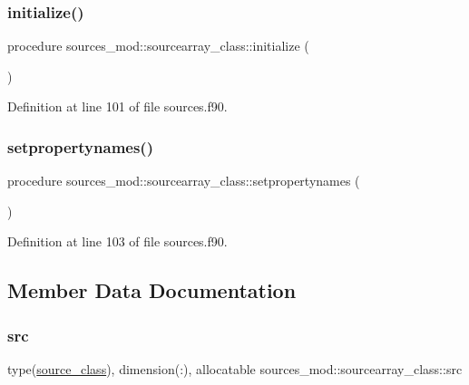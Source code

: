 \subsubsection{\texorpdfstring{initialize()}{initialize()}}
{\footnotesize\ttfamily procedure sources\+\_\+mod\+::sourcearray\+\_\+class\+::initialize (\begin{DoxyParamCaption}{ }\end{DoxyParamCaption})\hspace{0.3cm}{\ttfamily [private]}}



Definition at line 101 of file sources.\+f90.

\mbox{\label{structsources__mod_1_1sourcearray__class_afb2019a51e85dc19c66bf78e7b0b51c2}} 
\subsubsection{\texorpdfstring{setpropertynames()}{setpropertynames()}}
{\footnotesize\ttfamily procedure sources\+\_\+mod\+::sourcearray\+\_\+class\+::setpropertynames (\begin{DoxyParamCaption}{ }\end{DoxyParamCaption})\hspace{0.3cm}{\ttfamily [private]}}



Definition at line 103 of file sources.\+f90.



\subsection{Member Data Documentation}
\mbox{\label{structsources__mod_1_1sourcearray__class_ac5330284d9b377fda2051add379945b3}} 
\subsubsection{\texorpdfstring{src}{src}}
{\footnotesize\ttfamily type(\mbox{\hyperlink{structsources__mod_1_1source__class}{source\+\_\+class}}), dimension(\+:), allocatable sources\+\_\+mod\+::sourcearray\+\_\+class\+::src\hspace{0.3cm}{\ttfamily [private]}}



